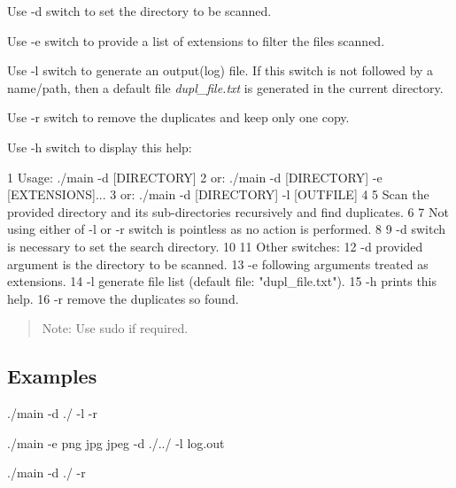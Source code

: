 \begin{DoxyEnumerate}
\item Use {\ttfamily -\/d} switch to set the directory to be scanned.
\item Use {\ttfamily -\/e} switch to provide a list of extensions to filter the files scanned.
\item Use {\ttfamily -\/l} switch to generate an output(log) file. If this switch is not followed by a name/path, then a default file {\itshape dupl\+\_\+file.\+txt} is generated in the current directory.
\item Use {\ttfamily -\/r} switch to remove the duplicates and keep only one copy.
\item Use {\ttfamily -\/h} switch to display this help\+:
\end{DoxyEnumerate}


\begin{DoxyCode}
1 Usage: ./main -d [DIRECTORY]
2 or: ./main -d [DIRECTORY] -e [EXTENSIONS]...
3 or: ./main -d [DIRECTORY] -l [OUTFILE]
4 
5 Scan the provided directory and its sub-directories recursively and find duplicates.
6 
7 Not using either of -l or -r switch is pointless as no action is performed.
8 
9 -d switch is necessary to set the search directory.
10 
11 Other switches:
12     -d      provided argument is the directory to be scanned.
13     -e      following arguments treated as extensions.
14     -l      generate file list (default file: "dupl\_file.txt").
15     -h      prints this help.
16     -r      remove the duplicates so found.
\end{DoxyCode}
 \begin{quote}
Note\+: Use {\ttfamily sudo} if required. \end{quote}


\subsection*{Examples}


\begin{DoxyEnumerate}
\item {\ttfamily ./main -\/d ./ -\/l -\/r}
\item {\ttfamily ./main -\/e png jpg jpeg -\/d ./../ -\/l log.\+out}
\item {\ttfamily ./main -\/d ./ -\/r} 
\end{DoxyEnumerate}